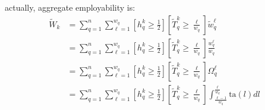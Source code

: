 \documentclass[hidelinks, nonatbib]{elsarticle}
\begin{document}
\begin{enumerate}
    actually, aggregate employability is:
    \begin{align}
        \tilde{W}_{k}
        &= 
        \sum_{q=1}^{n}
        \sum_{\ell=1}^{w_q}
        \left[
            h_{q}^{k}
            \geq
            \frac{1}{2}
        \right]
        \left[
            \tilde{T}_{q}^{k}
            \geq
            \frac{\ell}{w_q}
        \right]
        \tilde{w}_{q}^{\ell}
        \\&= 
        \sum_{q=1}^{n}
        \sum_{\ell=1}^{w_q}
        \left[
            h_{q}^{k}
            \geq
            \frac{1}{2}
        \right]
        \left[
            \tilde{T}_{q}^{k}
            \geq
            \frac{\ell}{w_q}
        \right]
        \frac{
            w_{q}^{\ell}
        }{
            w_q
        }
        \\&= 
        \sum_{q=1}^{n}
        \sum_{\ell=1}^{w_q}
        \left[
            h_{q}^{k}
            \geq
            \frac{1}{2}
        \right]
        \left[
            \tilde{T}_{q}^{k}
            \geq
            \frac{\ell}{w_q}
        \right]
        \Omega_{q}^{\ell}
        \\&= 
        \sum_{q=1}^{n}
        \sum_{\ell=1}^{w_q}
        \left[
            h_{q}^{k}
            \geq
            \frac{1}{2}
        \right]
        \left[
            \tilde{T}_{q}^{k}
            \geq
            \frac{\ell}{w_q}
        \right]
        \int_{
            \frac{\ell - 1}{w_q}
        }^{
            \frac{\ell}{w_q}
        }
        \text{ta}(l)dl
    \end{align}


\end{enumerate}
\end{document}
